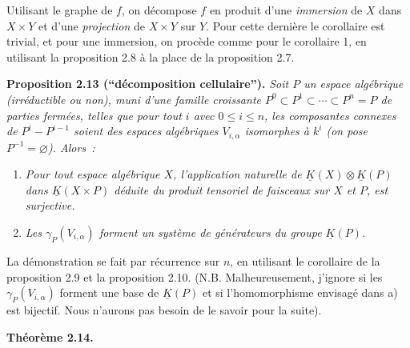 Utilisant le graphe de $f$, on décompose $f$ en produit d'une \emph{immersion} de $X$ dans $X\times Y$ et d'une \emph{projection} de $X\times Y$ sur $Y$. Pour cette dernière le corollaire est trivial, et pour une immersion, on procède comme pour le corollaire 1, en utilisant la proposition 2.8 à la place de la proposition 2.7.

\textbf{Proposition 2.13 (``décomposition cellulaire'').} \emph{Soit $P$ un espace algébrique (irréductible ou non), muni d'une famille croissante $P^0\subset P^1\subset\cdots\subset P^n=P$ de parties fermées, telles que pour tout $i$ avec $0\leq i\leq n$, les composantes connexes de $P^i-P^{i-1}$ soient des espaces algébriques $V_{i,\alpha}$ isomorphes à $k^i$ (on pose $P^{-1}=\varnothing$). Alors~:}
\begin{enumerate}[label=\alph*)]
\item \emph{Pour tout espace algébrique $X$, l'application naturelle de $\underline K(X)\otimes\underline K(P)$ dans $\underline K(X\times P)$ déduite du produit tensoriel de faisceaux sur $X$ et $P$, est surjective.}
\item \emph{Les $\gamma_P(V_{i,\alpha})$ forment un système de générateurs du groupe $\underline K(P)$.}
\end{enumerate}
La démonstration se fait par récurrence sur $n$, en utilisant le corollaire de la proposition 2.9 et la proposition 2.10. (N.B. Malheureusement, j'ignore si les $\gamma_P(V_{i,\alpha})$ forment une base de $\underline K(P)$ et si l'homomorphisme envisagé dans a) est bijectif. Nous n'aurons pas besoin de le savoir pour la suite).

\textbf{Théorème 2.14.}
